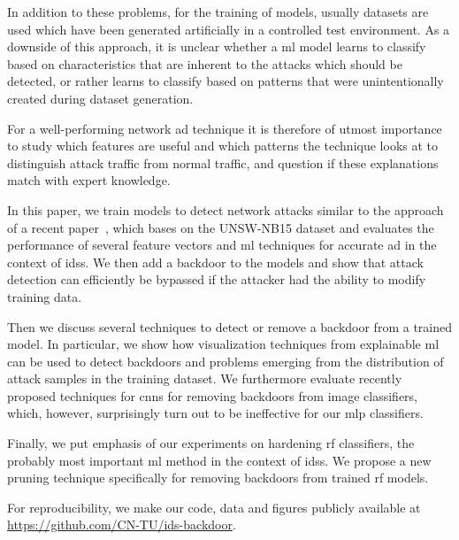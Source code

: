 \documentclass[9pt,sigconf,letterpaper,dvipsnames\ifx\removeHeaders\tempYes ,nonacm\fi]{acmart}
\newcommand{\unsw}{UNSW-NB15}
\begin{document}
In addition to these problems, for the training of models, usually datasets are used which have been generated artificially in a controlled test environment. As a downside of this approach, it is unclear whether a \gls{ml} model learns to classify based on characteristics that are inherent to the attacks which should be detected, or rather learns to classify based on patterns that were unintentionally created during dataset generation.

For a well-performing network \gls{ad} technique it is therefore of utmost importance to study which features are useful and which patterns the technique looks at to distinguish attack traffic from normal traffic, and question if these explanations match with expert knowledge.

In this paper, we train models to detect network attacks similar to the approach of a recent paper~\cite{meghdouri_analysis_2018}, which bases on the \unsw{} dataset \cite{moustafa_unsw-nb15:_2015} and evaluates the performance of several feature vectors and \gls{ml} techniques for accurate \gls{ad} in the context of \glspl{ids}.
We then add a backdoor to the models and show that attack detection can efficiently be bypassed if the attacker had the ability to modify training data.

Then we discuss several techniques to detect or remove a backdoor from a trained model. In particular, we show how visualization techniques from explainable \gls{ml} can be used to detect backdoors and problems emerging from the distribution of attack samples in the training dataset.
We furthermore evaluate recently proposed techniques for \glspl{cnn} for removing backdoors from image classifiers, which, however, surprisingly turn out to be ineffective for our \gls{mlp} classifiers.


Finally, we put emphasis of our experiments on hardening \gls{rf} classifiers, the probably most important \gls{ml} method in the context of \glspl{ids}.
We propose a new pruning technique specifically for removing backdoors from trained \gls{rf} models.

For reproducibility, we make our code, data and figures publicly available at \url{https://github.com/CN-TU/ids-backdoor}.
\end{document}
